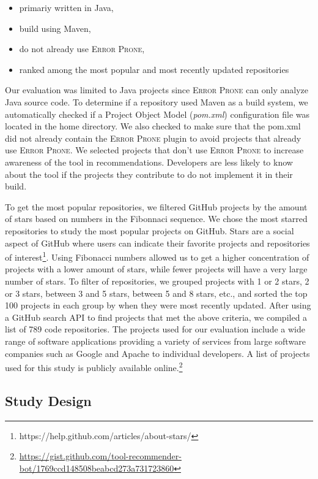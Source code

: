 \documentclass[sigconf,review,anonymous]{acmart}
\begin{document}
\begin{itemize}
\item primariy written in Java,
\item build using Maven,
\item do not already use \textsc{Error Prone},
\item ranked among the most popular and most recently updated repositories
\end{itemize}

Our evaluation was limited to Java projects since \textsc{Error Prone} can only analyze Java source code. To determine if a repository used Maven as a build system, we automatically checked if a Project Object Model (\textit{pom.xml}) configuration file was located in the home directory. We also checked to make sure that the pom.xml did not already contain the \textsc{Error Prone} plugin to avoid projects that already use \textsc{Error Prone}. We selected projects that don't use \textsc{Error Prone} to increase awareness of the tool in recommendations. Developers are less likely to know about the tool if the projects they contribute to do not implement it in their build. 

To get the most popular repositories, we filtered GitHub projects by the amount of stars based on numbers in the Fibonnaci sequence. We chose the most starred repositories to study the most popular projects on GitHub. Stars are a social aspect of GitHub where users can indicate their favorite projects and repositories of interest\footnote{https://help.github.com/articles/about-stars/}. Using Fibonacci numbers allowed us to get a higher concentration of projects with a lower amount of stars, while fewer projects will have a very large number of stars. To filter of repositories, we grouped projects with 1 or 2 stars, 2 or 3 stars, between 3 and 5 stars, between 5 and 8 stars, etc., and sorted the top 100 projects in each group by when they were most recently updated. After using a GitHub search API to find projects that met the above criteria, we compiled a list of 789 code repositories. The projects used for our evaluation include a wide range of software applications providing a variety of services from large software companies such as Google and Apache to individual developers. A list of projects used for this study is publicly available online.\footnote{\url{https://gist.github.com/tool-recommender-bot/1769ccd148508beabcd273a731723860}}

\subsection{Study Design}
\end{document}
